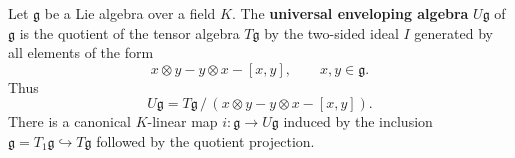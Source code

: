 Let $\mathfrak{g}$ be a Lie algebra over a field $K$. The \textbf{universal enveloping algebra} $U\mathfrak{g}$ of $\mathfrak{g}$ is the quotient of the tensor algebra $T\mathfrak{g}$ by the two-sided ideal $I$ generated by all elements of the form
$$
x \otimes y - y \otimes x - [x, y], \qquad x, y \in \mathfrak{g}.
$$
Thus
$$
U\mathfrak{g} = T\mathfrak{g} \,/\, (x \otimes y - y \otimes x - [x, y]).
$$
There is a canonical $K$-linear map $i : \mathfrak{g} \to U\mathfrak{g}$ induced by the inclusion $\mathfrak{g} = T_1 \mathfrak{g} \hookrightarrow T\mathfrak{g}$ followed by the quotient projection.
